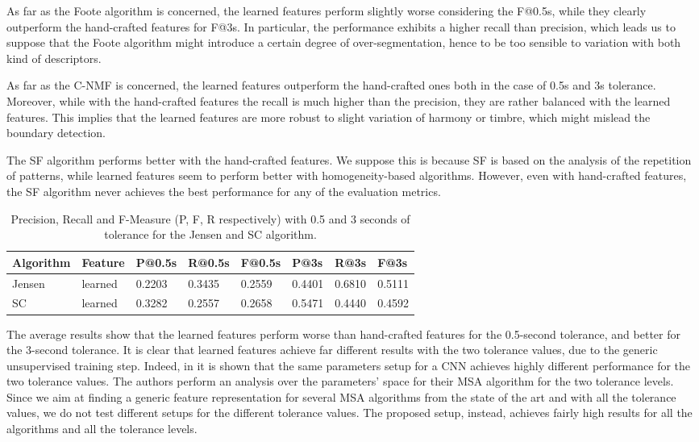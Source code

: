 As far as the Foote algorithm is concerned, the learned features perform slightly worse considering the F@0.5s, while they clearly outperform the hand-crafted features for F@3s. In particular, the performance exhibits a higher recall than precision, which leads us to suppose that the Foote algorithm might introduce a certain degree of over-segmentation, hence to be too sensible to variation with both kind of descriptors. 

As far as the C-NMF is concerned, the learned features outperform the hand-crafted ones both in the case of 0.5s and 3s tolerance. Moreover, while with the hand-crafted features the recall is much higher than the precision, they are rather balanced with the learned features. This implies that the learned features are more robust to slight variation of harmony or timbre, which might mislead the boundary detection.

The SF algorithm performs better with the hand-crafted features. We suppose this is because SF is based on the analysis of the repetition of patterns, while learned features seem to perform better with homogeneity-based algorithms. However, even with hand-crafted features, the SF algorithm never achieves the best performance for any of the evaluation metrics.

 \begin{table}[tb]
 \centering
 \caption{Precision, Recall and F-Measure (P, F, R respectively)  with 0.5 and 3 seconds of tolerance for the Jensen and SC algorithm.}
 \label{tab:MSA:resultsJSC}
 \bgroup
 \def\arraystretch{1.5}
 \begin{tabular}{||l|l|lll|lll||}
 \hline
  \hline
 Algorithm & Feature    & P@0.5s    & R@0.5s    & F@0.5s     & P@3s     & R@3s     & F@3s   \\
 \hline
  \hline
  Jensen     & learned         & 0.2203 & 0.3435 & 0.2559 & 0.4401 & 0.6810 & 0.5111 \\
  SC        & learned          & 0.3282 & 0.2557 & 0.2658 & 0.5471 & 0.4440 & 0.4592 \\
  \hline
   \hline
 \end{tabular}
 \egroup
 \end{table}

The average results show that the learned features perform worse than hand-crafted features for the 0.5-second tolerance, and better for the 3-second tolerance. It is clear that learned features achieve far different results with the two tolerance values, due to the generic unsupervised training step. Indeed, in \cite{ullrich2014boundary} it is shown that the same parameters setup for a CNN achieves highly different performance for the two tolerance values. The authors perform an analysis over the parameters' space for their MSA algorithm for the two tolerance levels. Since we aim at finding a generic feature representation for several MSA algorithms from the state of the art and with all the tolerance values, we do not test different setups for the different tolerance values. The proposed setup, instead, achieves fairly high results for all the algorithms and all the tolerance levels.

